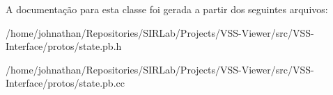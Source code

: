 A documentação para esta classe foi gerada a partir dos seguintes arquivos\+:\begin{DoxyCompactItemize}
\item 
/home/johnathan/\+Repositories/\+S\+I\+R\+Lab/\+Projects/\+V\+S\+S-\/\+Viewer/src/\+V\+S\+S-\/\+Interface/protos/state.\+pb.\+h\item 
/home/johnathan/\+Repositories/\+S\+I\+R\+Lab/\+Projects/\+V\+S\+S-\/\+Viewer/src/\+V\+S\+S-\/\+Interface/protos/state.\+pb.\+cc\end{DoxyCompactItemize}
